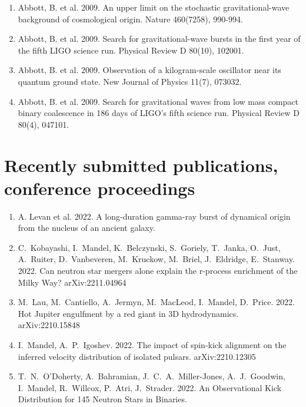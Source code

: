 \documentclass[margin,line]{res}
\begin{document}
\begin{resume}
\begin{enumerate}
\item Abbott, B. et al. 2009. An upper limit on the stochastic gravitational-wave background of cosmological origin. Nature 460(7258), 990-994. 

\item Abbott, B. et al. 2009. Search for gravitational-wave bursts in the first year of the fifth LIGO science run. Physical Review D 80(10), 102001. 

\item Abbott, B. et al. 2009. Observation of a kilogram-scale oscillator near its quantum ground state. New Journal of Physics 11(7), 073032.

\item Abbott, B. et al. 2009. Search for gravitational waves from low mass compact binary coalescence in 186 days of LIGO's fifth science run. Physical Review D 80(4), 047101. 

\end{enumerate}

\section{\sc Recently submitted publications, conference proceedings}

\begin{enumerate}

\item A. Levan et al. 2022.  A long-duration gamma-ray burst of dynamical origin from the nucleus of an ancient galaxy.

\item C.~Kobayashi, I.~Mandel, K.~Belczynski, S.~Goriely, T.~Janka, O.~Just, A.~Ruiter, D.~Vanbeveren, M.~Kruckow, M.~Briel, J.~Eldridge, E.~Stanway.  2022.  Can neutron star mergers alone explain the r-process enrichment of the Milky Way?    arXiv:2211.04964

\item M.~Lau, M.~Cantiello, A.~Jermyn, M.~MacLeod, I.~Mandel, D.~Price.  2022.  Hot Jupiter engulfment by a red giant in 3D hydrodynamics.  arXiv:2210.15848

\item I.~Mandel, A.~P.~Igoshev.  2022.  The impact of spin-kick alignment on the inferred velocity distribution of isolated pulsars.  arXiv:2210.12305

\item T.~N.~O'Doherty, A.~Bahramian, J.~C.~A.~Miller-Jones, A.~J.~Goodwin, I.~Mandel, R.~Willcox, P.~Atri, J.~Strader.  2022.  An Observational Kick Distribution for 145 Neutron Stars in Binaries.  


\end{enumerate}
\end{resume}
\end{document}
